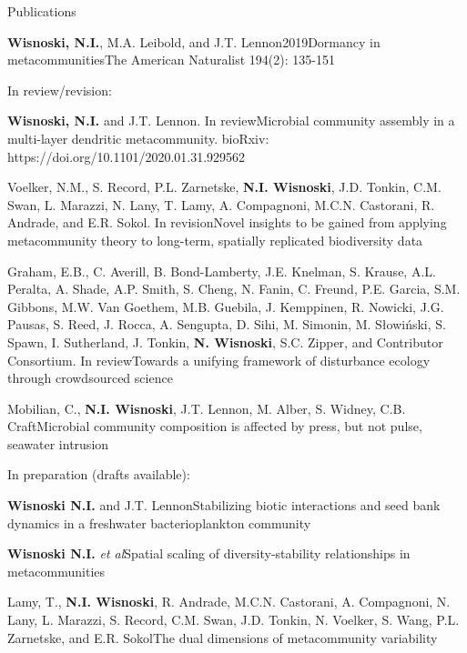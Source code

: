 \documentclass{resume} %
\begin{document}
\begin{rhangSection}{Publications}
\begin{Publication}{{\bf Wisnoski, N.I.}, M.A. Leibold, and J.T. Lennon}{2019}{Dormancy in metacommunities}{The American Naturalist 194(2): 135-151}
\end{Publication}

\bigskip
{ In review/revision:}

\begin{Prep}{{\bf Wisnoski, N.I.} and J.T. Lennon. In review}{Microbial community assembly in a multi-layer dendritic metacommunity. bioRxiv: https://doi.org/10.1101/2020.01.31.929562}
\end{Prep}

\begin{Prep}{Voelker, N.M., S. Record, P.L. Zarnetske, {\bf N.I. Wisnoski}, J.D. Tonkin, C.M. Swan, L. Marazzi, N. Lany, T. Lamy, A. Compagnoni, M.C.N. Castorani, R. Andrade, and E.R. Sokol. In revision}{Novel insights to be gained from applying metacommunity theory to long-term, spatially replicated biodiversity data}
\end{Prep}

\begin{Prep}{Graham, E.B., C. Averill, B. Bond-Lamberty, J.E. Knelman, S. Krause, A.L. Peralta, A. Shade, A.P. Smith, S. Cheng, N. Fanin, C. Freund, P.E. Garcia, S.M. Gibbons, M.W. Van Goethem, M.B. Guebila, J. Kemppinen, R. Nowicki, J.G. Pausas, S. Reed, J. Rocca, A. Sengupta, D. Sihi, M. Simonin, M. Słowiński, S. Spawn, I. Sutherland, J. Tonkin, {\bf N. Wisnoski}, S.C. Zipper, and Contributor Consortium. In review}{Towards a unifying framework of disturbance ecology through crowdsourced science}
\end{Prep}

\begin{Prep}{Mobilian, C., {\bf N.I. Wisnoski}, J.T. Lennon, M. Alber, S. Widney, C.B. Craft}{Microbial community composition is affected by press, but not pulse, seawater intrusion}
\end{Prep}

\bigskip
{ In preparation (drafts available):}

\begin{Prep}{{\bf Wisnoski N.I.} and J.T. Lennon}{Stabilizing biotic interactions and seed bank dynamics in a freshwater bacterioplankton community}
\end{Prep}

\begin{Prep}{{\bf Wisnoski N.I.} \emph{et al}}{Spatial scaling of diversity-stability relationships in metacommunities}
\end{Prep}

\begin{Prep}{Lamy, T., {\bf N.I. Wisnoski}, R. Andrade, M.C.N. Castorani, A. Compagnoni, N. Lany, L. Marazzi, S. Record, C.M. Swan, J.D. Tonkin, N. Voelker, S. Wang, P.L. Zarnetske, and E.R. Sokol}{The dual dimensions of metacommunity variability}
\end{Prep}


\end{rhangSection}
\end{document}
